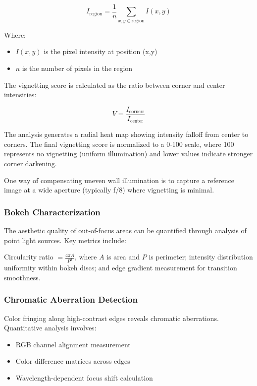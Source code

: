 \begin{equation}
I_{\text{region}} = \frac{1}{n} \sum_{x,y \in \text{region}} I(x,y)
\end{equation}

Where:
\begin{itemize}
    \item \( I(x,y) \) is the pixel intensity at position (x,y)
    \item \( n \) is the number of pixels in the region
\end{itemize}

The vignetting score is calculated as the ratio between corner and center intensities:

\begin{equation}
V = \frac{I_{\text{corners}}}{I_{\text{center}}}
\end{equation}

The analysis generates a radial heat map showing intensity falloff from center to corners. The final vignetting score is normalized to a 0-100 scale, where 100 represents no vignetting (uniform illumination) and lower values indicate stronger corner darkening.

One way of compensating uneven wall illumination is to capture a reference image at a wide aperture (typically f/8) where vignetting is minimal.

\subsubsection{Bokeh Characterization}
The aesthetic quality of out-of-focus areas can be quantified through analysis of point light sources. Key metrics include:

Circularity ratio \( = \frac{4\pi A}{P^2} \), where \( A \) is area and \( P \) is perimeter; intensity distribution uniformity within bokeh discs; and edge gradient measurement for transition smoothness.

\subsubsection{Chromatic Aberration Detection}
Color fringing along high-contrast edges reveals chromatic aberrations. Quantitative analysis involves:

\begin{itemize}
    \item RGB channel alignment measurement
    \item Color difference matrices across edges
    \item Wavelength-dependent focus shift calculation
\end{itemize}

